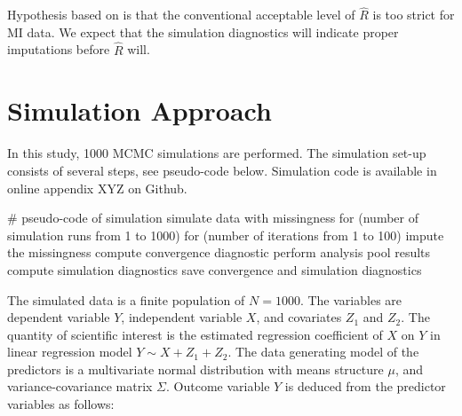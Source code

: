 \documentclass[article]{jss}
\begin{document}


Hypothesis based on \cite{lace07} is that the conventional acceptable level of $\widehat{R}$ is too strict for MI data. We expect that the simulation diagnostics will indicate proper imputations before $\widehat{R}$ will. 



\section{Simulation Approach}

In this study, 1000 MCMC simulations are performed. The simulation set-up consists of several steps, see pseudo-code below. Simulation code is available in online appendix XYZ on Github.

\begin{Code}
# pseudo-code of simulation 
simulate data with missingness
for (number of simulation runs from 1 to 1000)
  for (number of iterations from 1 to 100)
    impute the missingness
    compute convergence diagnostic
    perform analysis
    pool results
    compute simulation diagnostics
save convergence and simulation diagnostics
\end{Code}

The simulated data is a finite population of $N=1000$. The variables are dependent variable $Y$, independent variable $X$, and covariates $Z_1$ and $Z_2$. The quantity of scientific interest is the estimated regression coefficient of $X$ on $Y$ in linear regression model $Y \sim X+Z_1+Z_2$. The data generating model of the predictors is a multivariate normal distribution with means structure $\mu$, and variance-covariance matrix $\Sigma$. Outcome variable $Y$ is deduced from the predictor variables as follows:
\end{document}
